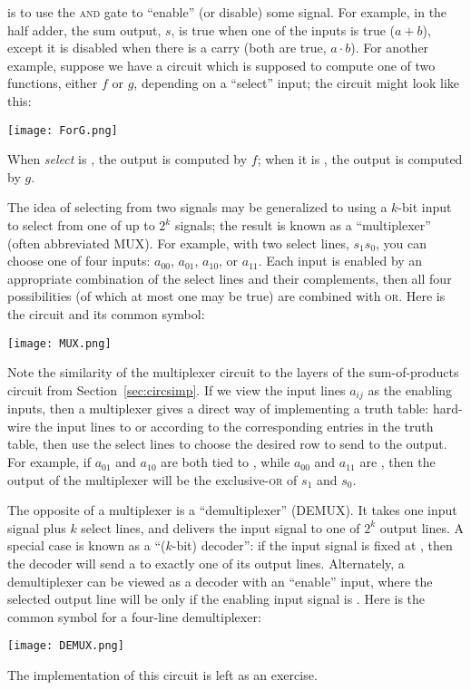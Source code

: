  is to use the \textsc{and} gate to ``enable'' (or disable) some signal. For example, in the half adder, the sum output, $s$, is true when one of the inputs is true ($a+b$), except it is disabled when there is a carry (both are true, $a\cdot b$). For another example, suppose we have a circuit which is supposed to compute one of two functions, either $f$ or $g$, depending on a ``select'' input; the circuit might look like this:
\begin{center}
\texttt{[image: ForG.png]}
\end{center}
When \textit{select} is \0, the output is computed by $f$; when it is \1, the output is computed by $g$.

The idea of selecting from two signals may be generalized to using a $k$-bit input to select from one of up to $2^k$ signals; the result is known as a ``multiplexer'' (often abbreviated MUX). For example, with two select lines, $s_1s_0$, you can choose one of four inputs: $a_{00}$, $a_{01}$, $a_{10}$, or $a_{11}$. Each input is enabled by an appropriate combination of the select lines and their complements, then all four possibilities (of which at most one may be true) are combined with \textsc{or}. Here is the circuit and its common symbol:
\begin{center}
\texttt{[image: MUX.png]}
\end{center}

Note the similarity of the multiplexer circuit to the layers of the sum-of-products circuit from Section~\ref{sec:circsimp}. If we view the input lines $a_{ij}$ as the enabling inputs, then a multiplexer gives a direct way of implementing a truth table: hard-wire the input lines to \0 or \1 according to the corresponding entries in the truth table, then use the select lines to choose the desired row to send to the output. For example, if $a_{01}$ and $a_{10}$ are both tied to \1, while $a_{00}$ and $a_{11}$ are \0, then the output of the multiplexer will be the exclusive-\textsc{or} of $s_1$ and $s_0$.

The opposite of a multiplexer is a ``demultiplexer'' (DEMUX). It takes one input signal plus $k$ select lines, and delivers the input signal to one of $2^k$ output lines. A special case is known as a ``($k$-bit) decoder'': if the input signal is fixed at \1, then the decoder will send a \1 to exactly one of its output lines. Alternately, a demultiplexer can be viewed as a decoder with an ``enable'' input, where the selected output line will be \1 only if the enabling input signal is \1. Here is the common symbol for a four-line demultiplexer:
\begin{center}
\texttt{[image: DEMUX.png]}
\end{center}
The implementation of this circuit is left as an exercise.

